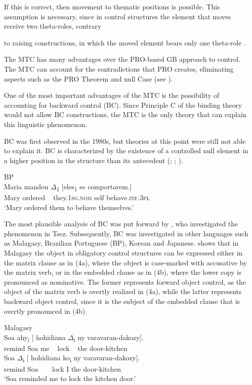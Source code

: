 \documentclass[output=paper]{langsci/langscibook}
\begin{document}
If this is correct, then movement to thematic positions is possible. This assumption is necessary, since in control structures the element that moves receive two theta-roles, contrary

to raising constructions, in which the moved element bears only one theta-role \citep{Hornstein1999}.

The MTC has many advantages over the PRO-based GB approach to control. The MTC can account for the contradictions that PRO creates, eliminating aspects such as the PRO Theorem and null Case (see \citealt{Hornstein2001}). 

One of the most important advantages of the MTC is the possibility of accounting for backward control (BC). Since Principle C of the binding theory would not allow BC constructions, the MTC is the only theory that can explain this linguistic phenomenon. 

BC was first observed in the 1980s, but theories at this point were still not able to explain it. BC is characterized by the existence of a controlled null element in a higher position in the structure than its antecedent (\citealt{Farell1995}; \citealt{Rodrigues2004}; \citealt{Boeckx2006}). 

\ea%
    BP\label{ex:moreno:3}\\
    \gll Maria mandou ${\Delta}$\textsubscript{1} [eles\textsubscript{1} se comportarem.]  \\
         Mary ordered ~ they.\textsc{1sg.nom} self behave.\textsc{inf.3pl}\\
    \glt ‘Mary ordered them to behave themselves.’
    \z

The most plausible analysis of BC was put forward by \citet{Polinsky2002}, who investigated the phenomenon in Tsez. Subsequently, BC was investigated in other languages such as Malagasy, Brazilian Portuguese (BP), Korean and Japanese. \citet{Potsdam2009} shows that in Malagasy the object in obligatory control structures can be expressed either in the matrix clause as in (4a), where the object is case-marked with accusative by the matrix verb, or in the embedded clause as in (4b), where the lower copy is pronounced as nominative. The former represents forward object control, as the object of the matrix verb is overtly realized in (4a), while the latter represents backward object control, since it is the subject of the embedded clause that is overtly pronounced in (4b). 

\ea%
    Malagasy \citep[755]{Potsdam2009}\label{ex:moreno:4}\\
    \ea
     Soa  ahy\textsubscript{i} [ hohidiana ${\Delta}$\textsubscript{i}   ny varavaran-dakozy].\\
         remind                 Soa   me   ~ lock ~ the door-kitchen\\
    \ex
     Soa  ${\Delta}$\textsubscript{i}        [ hohidiana ko\textsubscript{i}   ny varavaran-dakozy].\\
         remind                    Soa    ~ ~ lock          I      the door-kitchen\\
    \glt ‘Soa reminded me to lock the kitchen door.’
    \z
\z
\end{document}
